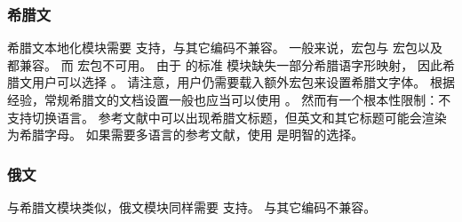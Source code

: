 \subsubsection{希腊文}%
\label{use:loc:grk}


希腊文本地化模块需要 \utf 支持，与其它编码不兼容。
一般来说，\biblatex 宏包与  宏包以及 \XeLaTeX 都兼容。
而  宏包不可用。
由于  的标准  模块缺失一部分希腊语字形映射，
因此希腊文用户可以选择 \XeLaTeX 。
请注意，用户仍需要载入额外宏包来设置希腊文字体。
根据经验，常规希腊文的文档设置一般也应当可以使用 \biblatex 。
然而有一个根本性限制：\biblatex 不支持切换语言。
参考文献中可以出现希腊文标题，但英文和其它标题可能会渲染为希腊字母。
如果需要多语言的参考文献，使用 \XeLaTeX 是明智的选择。

\subsubsection{俄文}%
\label{use:loc:rus}


与希腊文模块类似，俄文模块同样需要 \utf 支持。
与其它编码不兼容。

